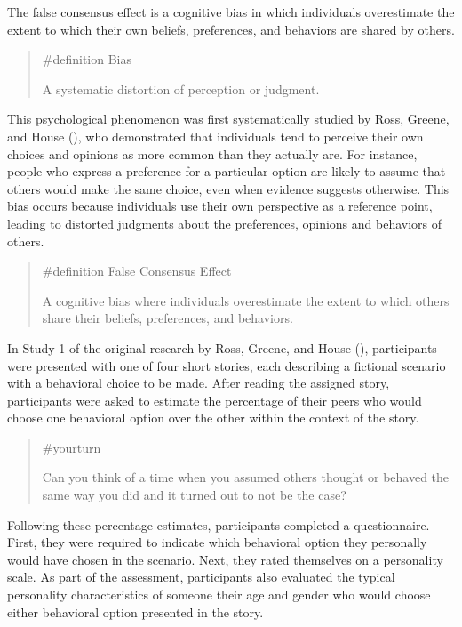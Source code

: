 \documentclass[
  letterpaper,
]{book}
\begin{document}
The false consensus effect is a cognitive bias in which individuals
overestimate the extent to which their own beliefs, preferences, and
behaviors are shared by others.

\begin{quote}
\label{def-bias}{\#definition} Bias

A systematic distortion of perception or judgment.
\end{quote}

This psychological phenomenon was first systematically studied by Ross,
Greene, and House (), who
demonstrated that individuals tend to perceive their own choices and
opinions as more common than they actually are. For instance, people who
express a preference for a particular option are likely to assume that
others would make the same choice, even when evidence suggests
otherwise. This bias occurs because individuals use their own
perspective as a reference point, leading to distorted judgments about
the preferences, opinions and behaviors of others.

\begin{quote}
\label{def-falseconsensus}{\#definition} False Consensus
Effect

A cognitive bias where individuals overestimate the extent to which
others share their beliefs, preferences, and behaviors.
\end{quote}

In Study 1 of the original research by Ross, Greene, and House
(), participants were presented with
one of four short stories, each describing a fictional scenario with a
behavioral choice to be made. After reading the assigned story,
participants were asked to estimate the percentage of their peers who
would choose one behavioral option over the other within the context of
the story.

\begin{quote}
{\#yourturn}

Can you think of a time when you assumed others thought or behaved the
same way you did and it turned out to not be the case?
\end{quote}

Following these percentage estimates, participants completed a
questionnaire. First, they were required to indicate which behavioral
option they personally would have chosen in the scenario. Next, they
rated themselves on a personality scale. As part of the assessment,
participants also evaluated the typical personality characteristics of
someone their age and gender who would choose either behavioral option
presented in the story.
\end{document}

